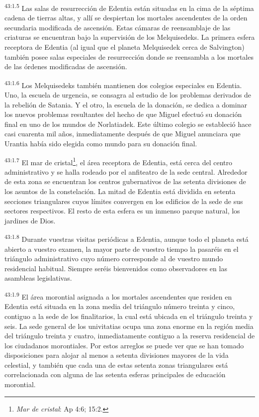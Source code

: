 \par
\textsuperscript{43:1.5} Las salas de resurrección de Edentia están situadas en la cima de la séptima cadena de tierras altas, y allí se despiertan los mortales ascendentes de la orden secundaria modificada de ascensión. Estas cámaras de reensamblaje de las criaturas se encuentran bajo la supervisión de los Melquisedeks. La primera esfera receptora de Edentia (al igual que el planeta Melquisedek cerca de Salvington) también posee salas especiales de resurrección donde se reensambla a los mortales de las órdenes modificadas de ascensión.

\par
\textsuperscript{43:1.6} Los Melquisedeks también mantienen dos colegios especiales en Edentia. Uno, la escuela de urgencia, se consagra al estudio de los problemas derivados de la rebelión de Satania. Y el otro, la escuela de la donación, se dedica a dominar los nuevos problemas resultantes del hecho de que Miguel efectuó su donación final en uno de los mundos de Norlatiadek. Este último colegio se estableció hace casi cuarenta mil años, inmediatamente después de que Miguel anunciara que Urantia había sido elegida como mundo para su donación final.

\par
\textsuperscript{43:1.7} El mar de cristal\footnote{\textit{Mar de cristal}: Ap 4:6; 15:2.}, el área receptora de Edentia, está cerca del centro administrativo y se halla rodeado por el anfiteatro de la sede central. Alrededor de esta zona se encuentran los centros gubernativos de las setenta divisiones de los asuntos de la constelación. La mitad de Edentia está dividida en setenta secciones triangulares cuyos límites convergen en los edificios de la sede de sus sectores respectivos. El resto de esta esfera es un inmenso parque natural, los jardines de Dios.

\par
\textsuperscript{43:1.8} Durante vuestras visitas periódicas a Edentia, aunque todo el planeta está abierto a vuestro examen, la mayor parte de vuestro tiempo la pasaréis en el triángulo administrativo cuyo número corresponde al de vuestro mundo residencial habitual. Siempre seréis bienvenidos como observadores en las asambleas legislativas.

\par
\textsuperscript{43:1.9} El área morontial asignada a los mortales ascendentes que residen en Edentia está situada en la zona media del triángulo número treinta y cinco, contiguo a la sede de los finalitarios, la cual está ubicada en el triángulo treinta y seis. La sede general de los univitatias ocupa una zona enorme en la región media del triángulo treinta y cuatro, inmediatamente contiguo a la reserva residencial de los ciudadanos morontiales. Por estos arreglos se puede ver que se han tomado disposiciones para alojar al menos a setenta divisiones mayores de la vida celestial, y también que cada una de estas setenta zonas triangulares está correlacionada con alguna de las setenta esferas principales de educación morontial.

